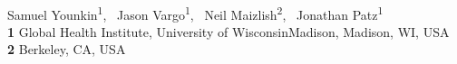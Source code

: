 \documentclass[10pt,letterpaper]{article}
\date{}
\begin{document}
\vspace*{0.2in}

\begin{flushleft}
{\Large
\textbf{} %
}
\newline
\\
Samuel Younkin\textsuperscript{1},\ %
Jason Vargo\textsuperscript{1},\ %
Neil Maizlish\textsuperscript{2},\ %
Jonathan Patz\textsuperscript{1}%
\\
\bigskip
\textbf{1} Global Health Institute, University of Wisconsin{\textendash}Madison, Madison, WI, USA
\\
\textbf{2} Berkeley, CA, USA
\\
\bigskip

% 
%








\end{flushleft}
\end{document}
